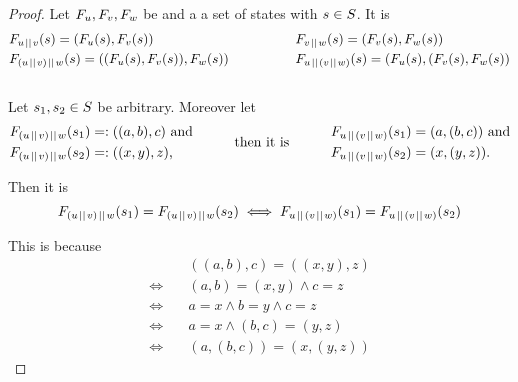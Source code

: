 \documentclass[preview]{standalone}
\begin{document}
\begin{proof}
Let $\grpfct[u], \grpfct[v], \grpfct[w]$ be \grpfctsN and a \states a set of states with $\state \in \states$. It is
\begin{equation*}
	\begin{aligned}[c]
		&\grpfct[u \pll v](\state) = (\grpfct[u](\state), \grpfct[v](\state)) \\
		&\grpfct[(u \pll v) \pll w](\state) = ((\grpfct[u](\state), \grpfct[v](\state)), \grpfct[w](\state))
	\end{aligned}
	\quad\quad\quad\quad\quad
	\begin{aligned}[c]
		&\grpfct[v \pll w](\state) = (\grpfct[v](\state), \grpfct[w](\state)) \\
		&\grpfct[u \pll (v \pll w)](\state) = (\grpfct[u](\state), (\grpfct[v](\state), \grpfct[w](\state))\\
	\end{aligned}					
\end{equation*}
\\
\noindent
Let $\state_1, \state_2 \in \states$ be arbitrary. Moreover let %
\begin{equation*}
	\begin{aligned}[c]
		&\grpfct[(u \pll v) \pll w](\state_1) =: ((a,b),c) \text{ and} \\
		&\grpfct[(u \pll v) \pll w](\state_2) =: ((x, y), z) \text{,}
	\end{aligned}
	\quad\quad\quad\text{then it is}\quad\quad\quad
	\begin{aligned}[c]
		&\grpfct[u \pll (v \pll w)](\state_1) = (a, (b, c)) \text{ and} \\
		&\grpfct[u \pll (v \pll w)](\state_2) = (x, (y, z)).
	\end{aligned}					
\end{equation*}

\noindent
Then it is
\[
	\grpfct[(u \pll v) \pll w](\state_1) = \grpfct[(u \pll v) \pll w](\state_2) \iff \grpfct[u \pll (v \pll w)](\state_1) = \grpfct[u \pll (v \pll w)](\state_2)
\]

\noindent
This is because
\begin{align*}
	&((a, b), c) = ((x, y), z) \\
	\iff \quad &(a, b) = (x, y) \land c = z \\
	\iff \quad &a = x \land b = y \land c = z \\
	\iff \quad &a = x \land (b, c) = (y, z) \\
	\iff \quad &(a, (b, c)) = (x, (y, z))
\end{align*}
\end{proof}



\end{document}
